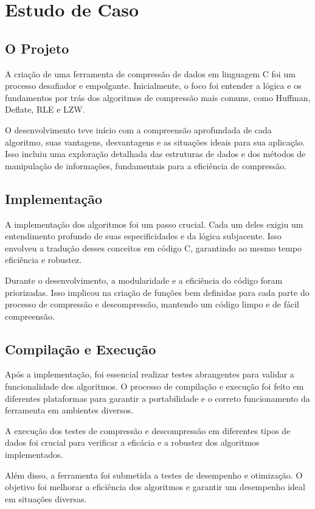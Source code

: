 \chapter{Estudo de Caso}
\label{cap:estudo}

\section{O Projeto}
A criação de uma ferramenta de compressão de dados em linguagem C foi um processo desafiador e empolgante. Inicialmente, o foco foi entender a lógica e os fundamentos por trás dos algoritmos de compressão mais comuns, como Huffman, Deflate, RLE e LZW.

O desenvolvimento teve início com a compreensão aprofundada de cada algoritmo, suas vantagens, desvantagens e as situações ideais para sua aplicação. Isso incluiu uma exploração detalhada das estruturas de dados e dos métodos de manipulação de informações, fundamentais para a eficiência de compressão.

\section{Implementação}
A implementação dos algoritmos foi um passo crucial. Cada um deles exigiu um entendimento profundo de suas especificidades e da lógica subjacente. Isso envolveu a tradução desses conceitos em código C, garantindo ao mesmo tempo eficiência e robustez.

Durante o desenvolvimento, a modularidade e a eficiência do código foram priorizadas. Isso implicou na criação de funções bem definidas para cada parte do processo de compressão e descompressão, mantendo um código limpo e de fácil compreensão.

\section{Compilação e Execução}
Após a implementação, foi essencial realizar testes abrangentes para validar a funcionalidade dos algoritmos. O processo de compilação e execução foi feito em diferentes plataformas para garantir a portabilidade e o correto funcionamento da ferramenta em ambientes diversos.

A execução dos testes de compressão e descompressão em diferentes tipos de dados foi crucial para verificar a eficácia e a robustez dos algoritmos implementados.

Além disso, a ferramenta foi submetida a testes de desempenho e otimização. O objetivo foi melhorar a eficiência dos algoritmos e garantir um desempenho ideal em situações diversas.

